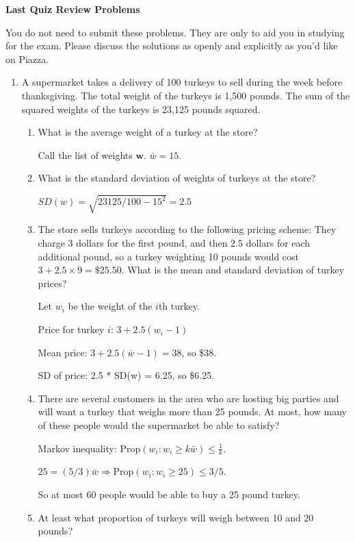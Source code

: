 \documentclass[11pt]{article}
\begin{document}
\centerline{\textbf{Last Quiz Review Problems}}
You do not need to submit these problems. They are only to aid you in studying for the exam. Please discuss the solutions as openly and explicitly as you'd like on Piazza.

\begin{enumerate}
\item A supermarket takes a delivery of 100 turkeys to sell during the week before thanksgiving.
The total weight of the turkeys is 1,500 pounds. The sum of the squared weights of the turkeys is 23,125 pounds squared.
\begin{enumerate}
    \item What is the average weight of a turkey at the store?

    {\color{red} Call the list of weights $\bm w$. $\bar w = 15$.}

    \item What is the standard deviation of weights of turkeys at the store?

    {\color{red} $SD(w) = \sqrt{23125/100 - 15^2} = 2.5$}

    \item The store sells turkeys according to the following pricing scheme: They charge 3 dollars for the first pound, and then 2.5 dollars for each additional pound, so
        a turkey weighting 10 pounds would cost $3 + 2.5 \times 9 = \$25.50$. What is the mean and standard deviation of turkey prices?

    {\color{red} Let $w_i$ be the weight of the $i$th turkey.

    Price for turkey $i$: $3 + 2.5(w_i-1)$

    Mean price: $3 + 2.5(\bar w-1) = 38$, so \$38.

    SD of price: 2.5 * SD(w) = 6.25, so \$6.25.}

    \item There are several customers in the area who are hosting big parties and will want a turkey that weighs more than 25 pounds.
        At most, how many of these people would the supermarket be able to satisfy?

    {\color{red} Markov inequality: $\mathrm{Prop}(w_i: w_i \geq k\bar{w}) \leq \frac{1}{k}$.

    $25 = (5/3)  \bar w \Rightarrow \mathrm{Prop}(w_i : w_i \geq 25) \leq 3/5$.

    So at most 60 people would be able to buy a 25 pound turkey.}
    
    \item At least what proportion of turkeys will weigh between 10 and 20 pounds?


\end{enumerate}
\end{enumerate}
\end{document}
